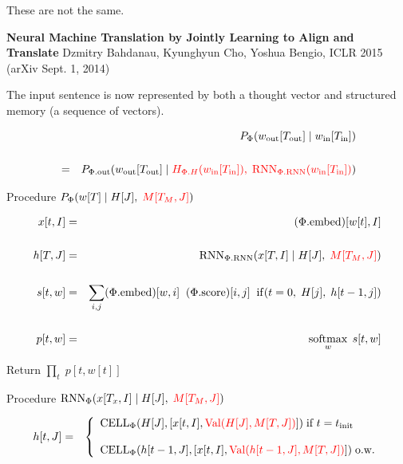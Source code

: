 {\vfill
These are not the same.




\vfill
{\bf Neural Machine Translation by Jointly Learning to Align and Translate}
Dzmitry Bahdanau, Kyunghyun Cho, Yoshua Bengio, ICLR 2015 (arXiv Sept. 1, 2014)


The input sentence is now represented by both a thought vector and structured memory (a sequence of vectors).

\vfill
\begin{eqnarray*}
 & & P_\Phi(w_{\mathrm{out}}[T_{\mathrm{out}}] \;|\; w_{\mathrm{in}}[T_{\mathrm{in}}]) \\
 \\
& = & P_{\Phi.\mathrm{out}}(w_{\mathrm{out}}[T_{\mathrm{out}}]\;|\;
{\color{red} H_{\Phi.H}(w_{\mathrm{in}}[T_{\mathrm{in}}]),\;\mathrm{RNN}_{\Phi.\mathrm{RNN}}(w_{\mathrm{in}}[T_{\mathrm{in}}])})
\end{eqnarray*}


Procedure $P_\Phi(w[T] \;|\; H[J],\;{\color{red} M[T_M,J]})$

\vfill
{\huge \begin{eqnarray*}
x[t,I] & = & (\Phi.\mathrm{embed})[w[t],I] \\
\\
h[T,J] & = & \mathrm{RNN}_{\Phi.\mathrm{RNN}}(x[T,I] \;|\;H[J],\;{\color{red} M[T_M,J]}) \\        
\\
s[t,w] & = & \sum_{i,j} (\Phi.\mathrm{embed})[w,i]\;\;(\Phi.\mathrm{score})[i,j]\;\;\mathrm{if}(t=0,\;H[j],\;h[t-1,j]) \\
\\
p[t,w] & = & \operatorname*{softmax}_w\;s[t,w]
\end{eqnarray*}
}

\vfill
Return $\prod_t\;p[t,w[t]]$


Procedure $\mathrm{RNN}_\Phi(x[T_x,I] \;|\; H[J],\; {\color{red} M[T_M,J]})$

\vfill
\begin{eqnarray*}
h[t,J] & = & \left\{\begin{array}{l}
\mathrm{CELL}_\Phi(H[J],[x[t,I],{\color{red}\mathrm{Val}(H[J],M[T,J])}]) \;\mbox{if $t = t_{\mathrm{init}}$} \\
\\
\mathrm{CELL}_\Phi(h[t-1,J],[x[t,I],{\color{red}\mathrm{Val}(h[t-1,J],M[T,J])}])\;\mbox{o.w.} \\
\end{array}\right.
\end{eqnarray*}

}
